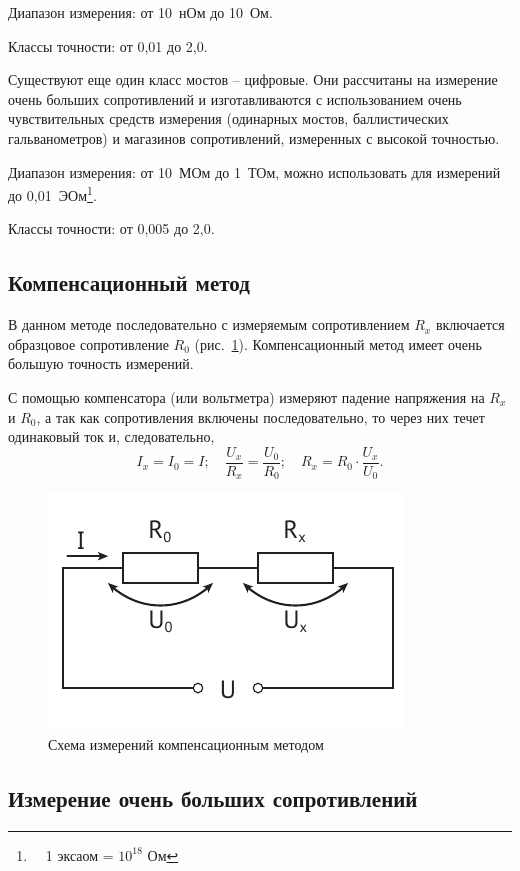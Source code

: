 \documentclass[pscyr]{hedwork}
\newcommand{\Pic}[1]{\ref{pic#1}}
\newcommand{\pic}[1]{рис.~\Pic{#1}}
\begin{document}
  Диапазон измерения: от 10~нОм до 10~Ом.
  
  Классы точности: от 0,01 до 2,0.
  
  \bigskip
  
  Существуют еще один класс мостов -- цифровые. Они рассчитаны на измерение
  очень больших сопротивлений и изготавливаются с использованием очень
  чувствительных средств измерения (одинарных мостов, баллистических
  гальванометров) и магазинов сопротивлений, измеренных с высокой точностью.
  
  Диапазон измерения: от 10~МОм до 1~ТОм, можно использовать для измерений до
    0,01~ЭОм\footnote{\ \ 1 эксаом = \( 10^{18} \) Ом}.
  
  Классы точности: от 0,005 до 2,0.
  
  \subsection{Компенсационный метод}
  
  В данном методе последовательно с измеряемым сопротивлением \( R_x \)
  включается образцовое сопротивление \( R_0 \) (\pic{comp}). Компенсационный
  метод имеет очень большую точность измерений.
  
  С помощью компенсатора (или вольтметра) измеряют падение напряжения на
  \( R_x \) и \( R_0 \), а так как сопротивления включены последовательно, то
  через них течет одинаковый ток и, следовательно,
  \[
    I_x = I_0 = I; \quad \frac{U_x}{R_x} = \frac{U_0}{R_0}; \quad
      R_x = R_0 \cdot \frac{U_x}{U_0}.
  \]
  
  \begin{figure}[!t]
    \center
    \includegraphics[width=.5\textwidth]{comp}
    \caption{Схема измерений компенсационным методом}
    \label{piccomp}
  \end{figure}

  \subsection{Измерение очень больших сопротивлений}
  
\end{document}
